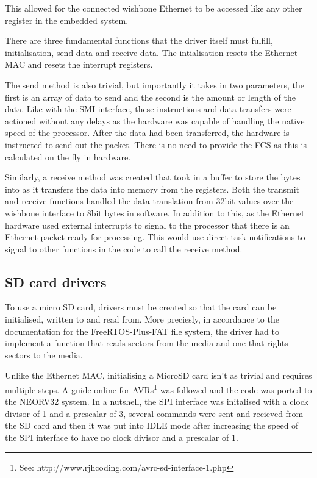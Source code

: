This allowed for the connected wishbone Ethernet to be accessed like any other register in the embedded system. 


There are three fundamental functions that the driver itself must fulfill, initialisation, send data and receive data. The intialisation resets the Ethernet MAC and resets the interrupt registers. 

The send method is also trivial, but importantly it takes in two parameters, the first is an array of data to send and the second is the amount or length of the data. Like with the SMI interface, these instructions and data transfers were actioned without any delays as the hardware was capable of handling the native speed of the processor. After the data had been transferred, the hardware is instructed to send out the packet. There is no need to provide the FCS as this is calculated on the fly in hardware. 

Similarly, a receive method was created that took in a buffer to store the bytes into as it transfers the data into memory from the registers. Both the transmit and receive functions handled the data translation from 32bit values over the wishbone interface to 8bit bytes in software. In addition to this, as the Ethernet hardware used external interrupts to signal to the processor that there is an Ethernet packet ready for processing. This would use direct task notifications to signal to other functions in the code to call the receive method. 


\subsection{SD card drivers}
\label{sec:microsd_drivers}
To use a micro SD card, drivers must be created so that the card can be initialised, written to and read from. More preciesly, in accordance to the  documentation for the FreeRTOS-Plus-FAT file system, the driver had to implement a function that reads sectors from the media and one that rights sectors to the media. 

Unlike the Ethernet MAC, initialising a MicroSD card isn't as trivial and requires multiple steps. A guide online for AVRs\footnote[1]{See: http://www.rjhcoding.com/avrc-sd-interface-1.php} was followed and the code was ported to the NEORV32 system. In a nutshell, the SPI interface was initalised with a clock divisor of 1 and a prescalar of 3, several commands were sent and recieved from the SD card and then it was put into IDLE mode after increasing the speed of the SPI interface to have no clock divisor and a prescalar of 1.

